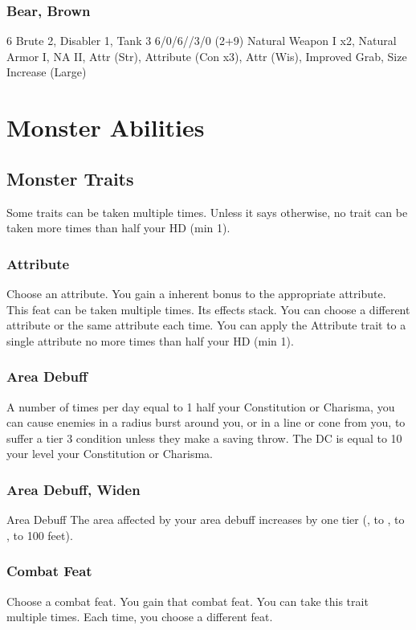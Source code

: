 \subsubsection{Bear, Brown}
 6
 Brute 2, Disabler 1, Tank 3
 6/0/6//3/0
 (2+9) Natural Weapon I x2, Natural Armor I, NA II, Attr (Str), Attribute (Con x3), Attr (Wis), Improved Grab, Size Increase (Large)

\section{Monster Abilities}

\subsection{Monster Traits}
Some traits can be taken multiple times. Unless it says otherwise, no trait can be taken more times than half your HD (min 1).

\subsubsection{Attribute}
Choose an attribute.
\featben You gain a  inherent bonus to the appropriate attribute.
 This feat can be taken multiple times. Its effects stack. You can choose a different attribute or the same attribute each time. You can apply the Attribute trait to a single attribute no more times than half your HD (min 1).

\subsubsection{Area Debuff}
\featben A number of times per day equal to 1 \add half your Constitution or Charisma, you can cause enemies in a \areasmall radius burst around you, or in a \areamed line or cone from you, to suffer a tier 3 condition unless they make a saving throw. The DC is equal to 10 \add your level \add your Constitution or Charisma.

\subsubsection{Area Debuff, Widen}
\featpre Area Debuff
\featben The area affected by your area debuff increases by one tier (\areasmall, to \areamed, to \arealarge, to 100 feet).

\subsubsection{Combat Feat}
Choose a combat feat.
\featben You gain that combat feat.
 You can take this trait multiple times. Each time, you choose a different feat.

